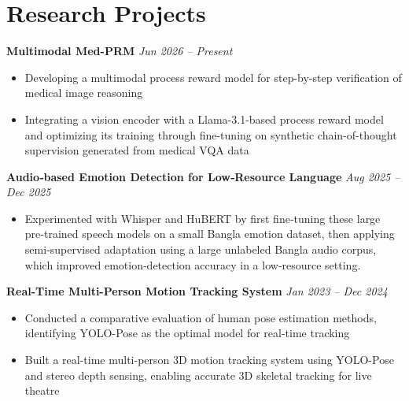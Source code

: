 \documentclass[10pt,letterpaper]{article}
\newcommand{\headingsimple}[2]{%
  \noindent\textbf{#1} \hfill #2\par
}
\begin{document}
\section{Research Projects}

\headingsimple{Multimodal Med-PRM}{\textit{Jun 2026 -- Present}}
\begin{itemize}
  \item Developing a multimodal process reward model for step-by-step verification of medical image reasoning
  \item Integrating a vision encoder with a Llama-3.1-based process reward model and optimizing its training through fine-tuning on synthetic chain-of-thought supervision generated from medical VQA data
\end{itemize}

\headingsimple{Audio‑based Emotion Detection for Low‑Resource Language}{\textit{Aug 2025 -- Dec 2025}}
\begin{itemize}
  \item Experimented with Whisper and HuBERT by first fine‑tuning these large pre‑trained speech models on a small Bangla emotion dataset, then applying semi‑supervised adaptation using a large unlabeled Bangla audio corpus, which improved emotion‑detection accuracy in a low‑resource setting.
\end{itemize}


\headingsimple{Real-Time Multi-Person Motion Tracking System}{\textit{Jan 2023 -- Dec 2024}}
\begin{itemize}
  \item Conducted a comparative evaluation of human pose estimation methods, identifying YOLO-Pose as the optimal model for real-time tracking
  \item Built a real-time multi-person 3D motion tracking system using YOLO-Pose and stereo depth sensing, enabling accurate 3D skeletal tracking for live theatre
\end{itemize}



\end{document}
